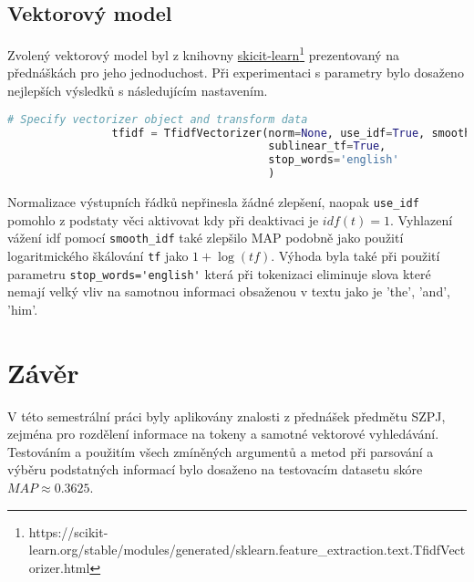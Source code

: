 \documentclass{article}
\begin{document}
		\subsection{Vektorový model}
			Zvolený vektorový model byl z knihovny \href{https://scikit-learn.org/stable/modules/generated/sklearn.feature_extraction.text.TfidfVectorizer.html}{skicit-learn}\footnote{https://scikit-learn.org/stable/modules/generated/sklearn.feature\_extraction.text.TfidfVectorizer.html} prezentovaný na přednáškách pro jeho jednoduchost. Při experimentaci s parametry bylo dosaženo nejlepších výsledků s následujícím nastavením.
			
			\begin{lstlisting}[language=Python]
				# Specify vectorizer object and transform data
				tfidf = TfidfVectorizer(norm=None, use_idf=True, smooth_idf=True, 
										sublinear_tf=True, 
										stop_words='english'
										)
			\end{lstlisting}
			
			Normalizace výstupních řádků nepřinesla žádné zlepšení, naopak \verb*|use_idf| pomohlo z podstaty věci aktivovat kdy při deaktivaci je \(idf(t)=1\). Vyhlazení vážení idf pomocí \verb*|smooth_idf| také zlepšilo MAP podobně jako použití logaritmického škálování \verb*|tf| jako \(1+\log(tf)\). Výhoda byla také při použití parametru \verb*|stop_words='english'| která při tokenizaci eliminuje slova které nemají velký vliv na samotnou informaci obsaženou v textu jako je 'the', 'and', 'him'.
			
	\newpage		
	\section{Závěr}
		V této semestrální práci byly aplikovány znalosti z přednášek předmětu SZPJ, zejména pro rozdělení informace na tokeny a samotné vektorové vyhledávání. Testováním a použitím všech zmíněných argumentů a metod při parsování a výběru podstatných informací bylo dosaženo na testovacím datasetu skóre \(MAP\approx0.3625\).
			
			
			
			
		
	
\end{document}
